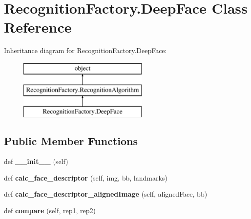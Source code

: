 \hypertarget{classRecognitionFactory_1_1DeepFace}{}\section{Recognition\+Factory.\+Deep\+Face Class Reference}
\label{classRecognitionFactory_1_1DeepFace}
Inheritance diagram for Recognition\+Factory.\+Deep\+Face\+:\begin{figure}[H]
\begin{center}
\leavevmode
\includegraphics[height=3.000000cm]{classRecognitionFactory_1_1DeepFace}
\end{center}
\end{figure}
\subsection*{Public Member Functions}
\begin{DoxyCompactItemize}
\item 
def {\bfseries \+\_\+\+\_\+init\+\_\+\+\_\+} (self)\hypertarget{classRecognitionFactory_1_1DeepFace_a4c39221f616ceccabdee5fa30b1f1675}{}\label{classRecognitionFactory_1_1DeepFace_a4c39221f616ceccabdee5fa30b1f1675}

\item 
def {\bfseries calc\+\_\+face\+\_\+descriptor} (self, img, bb, landmarks)\hypertarget{classRecognitionFactory_1_1DeepFace_a3f25f9fffd3f0781d4c0ec3105b500c9}{}\label{classRecognitionFactory_1_1DeepFace_a3f25f9fffd3f0781d4c0ec3105b500c9}

\item 
def {\bfseries calc\+\_\+face\+\_\+descriptor\+\_\+aligned\+Image} (self, aligned\+Face, bb)\hypertarget{classRecognitionFactory_1_1DeepFace_ac46fdf7ec084a68ab7b440b58b0efa1d}{}\label{classRecognitionFactory_1_1DeepFace_ac46fdf7ec084a68ab7b440b58b0efa1d}

\item 
def {\bfseries compare} (self, rep1, rep2)\hypertarget{classRecognitionFactory_1_1DeepFace_a71489c980fcab54725c11191d79673fe}{}\label{classRecognitionFactory_1_1DeepFace_a71489c980fcab54725c11191d79673fe}

\end{DoxyCompactItemize}
